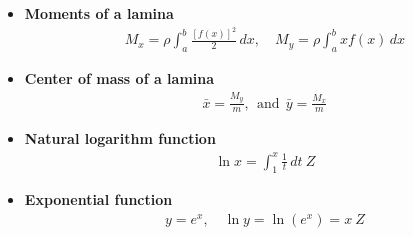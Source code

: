 \documentclass{report}
\begin{document}
\begin{itemize}
    \item \textbf{Moments of a lamina}
    \begin{align}
        M_x = \rho \int_{a}^{b} \frac{[f(x)]^2}{2} \, dx, \quad M_y = \rho \int_{a}^{b} x f(x) \, dx
    \end{align}

    \item \textbf{Center of mass of a lamina}
    \begin{align}
        \bar{x} = \frac{M_y}{m},\ \ \text{and}\ \  \bar{y} = \frac{M_x}{m}
    \end{align}

    \item \textbf{Natural logarithm function}
    \begin{align}
        \ln x = \int_{1}^{x} \frac{1}{t} \, dt\ Z
    \end{align}

    \item \textbf{Exponential function}
    \begin{align}
        y = e^x, \quad \ln y = \ln(e^x) = x\ Z
    \end{align}
    \end{itemize}
\end{document}
